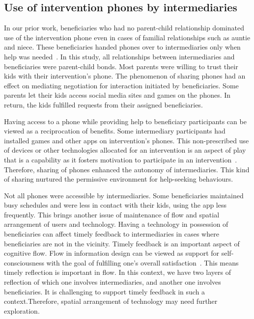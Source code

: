 \documentclass{sig-alternate}
\begin{document}
\subsection*{\textbf{Use of intervention phones by intermediaries}}
In our prior work, beneficiaries who had no parent-child relationship dominated use of the intervention phone even in cases of familial relationships such as auntie and niece. These beneficiaries handed phones over to intermediaries only when help was needed~\cite{katule2016:leveraging}. In this study, all relationships between intermediaries and beneficiaries were parent-child bonds. Most parents were willing to trust their kids with their intervention's phone. The phenomenon of sharing phones had an effect on mediating negotiation for interaction initiated by beneficiaries. Some parents let their kids access social media sites and games on the phones. In return, the kids fulfilled requests from their assigned beneficiaries.

Having access to a phone while providing help to beneficiary participants can be viewed as a reciprocation of benefits. Some intermediary participants had installed games and other apps on intervention's phones. This non-prescribed use of devices or other technologies allocated for an intervention is an aspect of play that is a capability as it fosters motivation to participate in an intervention~\cite{ferr2015:play}. Therefore, sharing of phones enhanced the autonomy of intermediaries. This kind of sharing nurtured the permissive environment for help-seeking behaviours.  

Not all phones were accessible by intermediaries. Some beneficiaries maintained busy schedules and were less in contact with their kids, using the app less frequently. This brings another issue of maintenance of flow and spatial arrangement of users and technology. Having a technology in possession of beneficiaries can affect timely feedback to intermediaries in cases where beneficiaries are not in the vicinity. Timely feedback is an important aspect of cognitive flow. Flow in information design can be viewed as support for self-consciousness with the goal of fulfilling one's overall satisfaction~\cite{csikszentmihalyiflow}. This means timely reflection is important in flow. In this context, we have two layers of reflection of which one involves intermediaries, and another one involves beneficiaries. It is challenging to support timely feedback in such a context.Therefore, spatial arrangement of technology may need further exploration.
\end{document}

